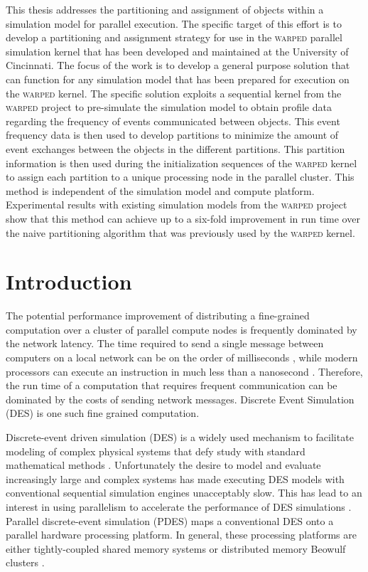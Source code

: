 \documentclass[11pt]{book}
\begin{document}
This thesis addresses the partitioning and assignment of objects within a simulation model for parallel execution. The specific target of this effort is to develop a partitioning and assignment strategy for use in the \textsc{warped} parallel simulation kernel that has been developed and maintained at the University of Cincinnati. The focus of the work is to develop a general purpose solution that can function for any simulation model that has been prepared for execution on the \textsc{warped} kernel. The specific solution exploits a sequential kernel from the \textsc{warped} project to pre-simulate the simulation model to obtain profile data regarding the frequency of events communicated between objects. This event frequency data is then used to develop partitions to minimize the amount of event exchanges between the objects in the different partitions. This partition information is then used during the initialization sequences of the \textsc{warped} kernel to assign each partition to a unique processing node in the parallel cluster. This method is independent of the simulation model and compute platform. Experimental results with existing simulation models from the \textsc{warped} project show that this method can achieve up to a six-fold improvement in run time over the naive partitioning algorithm that was previously used by the \textsc{warped} kernel.

\tableofcontents \markright{ }
\listoffigures \markright{ }
\listoftables \markright{ }

\clearpage
{} \setcounter{page}{1}

\chapter{Introduction}\label{intro} 

The potential performance improvement of distributing a fine-grained computation over a cluster of parallel compute nodes is frequently dominated by the network latency. The time required to send a single message between computers on a local network can be on the order of milliseconds \cite{larson-07}, while modern processors can execute an instruction in much less than a nanosecond \cite{sprangle-02}. Therefore, the run time of a computation that requires frequent communication can be dominated by the costs of sending network messages. Discrete Event Simulation (DES) is one such fine grained computation.

Discrete-event driven simulation (DES) is a widely used mechanism to facilitate modeling of complex physical systems that defy study with standard mathematical methods \cite{law-00}. Unfortunately the desire to model and evaluate increasingly large and complex systems has made executing DES models with conventional sequential simulation engines unacceptably slow. This has lead to an interest in using parallelism to accelerate the performance of DES simulations \cite{fujimoto-90}. Parallel discrete-event simulation (PDES) maps a conventional DES onto a parallel hardware processing platform. In general, these processing platforms are either tightly-coupled shared memory systems or distributed memory Beowulf clusters \cite{hennessy-12}.
\end{document}

